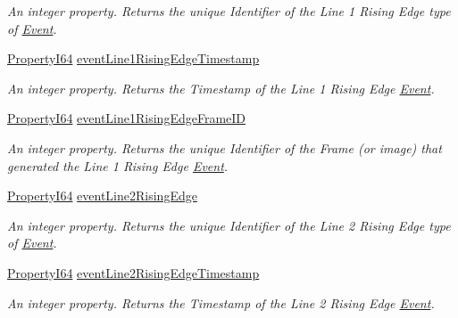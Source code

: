 \begin{DoxyCompactItemize}
\begin{DoxyCompactList}\small\item\em An integer property. Returns the unique Identifier of the Line 1 Rising Edge type of \hyperlink{classmv_i_m_p_a_c_t_1_1acquire_1_1_event}{Event}. \end{DoxyCompactList}\item 
\hyperlink{group___common_interface_ga81749b2696755513663492664a18a893}{Property\+I64} \hyperlink{classmv_i_m_p_a_c_t_1_1acquire_1_1_gen_i_cam_1_1_event_control_a899b8fe77d975c91532a2a536678a6be}{event\+Line1\+Rising\+Edge\+Timestamp}
\begin{DoxyCompactList}\small\item\em An integer property. Returns the Timestamp of the Line 1 Rising Edge \hyperlink{classmv_i_m_p_a_c_t_1_1acquire_1_1_event}{Event}. \end{DoxyCompactList}\item 
\hyperlink{group___common_interface_ga81749b2696755513663492664a18a893}{Property\+I64} \hyperlink{classmv_i_m_p_a_c_t_1_1acquire_1_1_gen_i_cam_1_1_event_control_a4c1dcfd7bf90bad0ce6ac08d2836c489}{event\+Line1\+Rising\+Edge\+Frame\+I\+D}
\begin{DoxyCompactList}\small\item\em An integer property. Returns the unique Identifier of the Frame (or image) that generated the Line 1 Rising Edge \hyperlink{classmv_i_m_p_a_c_t_1_1acquire_1_1_event}{Event}. \end{DoxyCompactList}\item 
\hyperlink{group___common_interface_ga81749b2696755513663492664a18a893}{Property\+I64} \hyperlink{classmv_i_m_p_a_c_t_1_1acquire_1_1_gen_i_cam_1_1_event_control_a134d37a9bbcf3a7fcab17f80704348db}{event\+Line2\+Rising\+Edge}
\begin{DoxyCompactList}\small\item\em An integer property. Returns the unique Identifier of the Line 2 Rising Edge type of \hyperlink{classmv_i_m_p_a_c_t_1_1acquire_1_1_event}{Event}. \end{DoxyCompactList}\item 
\hyperlink{group___common_interface_ga81749b2696755513663492664a18a893}{Property\+I64} \hyperlink{classmv_i_m_p_a_c_t_1_1acquire_1_1_gen_i_cam_1_1_event_control_a7da4655fc3267b456dd1dbead508aedf}{event\+Line2\+Rising\+Edge\+Timestamp}
\begin{DoxyCompactList}\small\item\em An integer property. Returns the Timestamp of the Line 2 Rising Edge \hyperlink{classmv_i_m_p_a_c_t_1_1acquire_1_1_event}{Event}. \end{DoxyCompactList}\item 

\end{DoxyCompactItemize}

